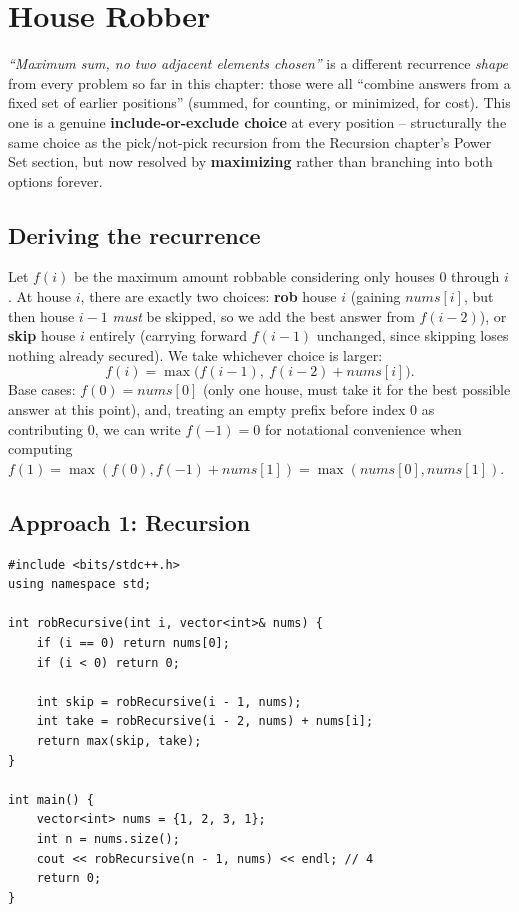 \section{House Robber}
\label{sec:dp-house-robber}


\begin{patternbox}
\emph{``Maximum sum, no two adjacent elements chosen''} is a different
recurrence \emph{shape} from every problem so far in this chapter: those
were all ``combine answers from a fixed set of earlier positions''
(summed, for counting, or minimized, for cost). This one is a genuine
\textbf{include-or-exclude choice} at every position -- structurally the
same choice as the pick/not-pick recursion from
the Recursion chapter's Power Set section, but now resolved by \textbf{maximizing}
rather than branching into both options forever.
\end{patternbox}

\subsection*{Deriving the recurrence}

Let $f(i)$ be the maximum amount robbable considering only houses $0$
through $i$. At house $i$, there are exactly two choices: \textbf{rob}
house $i$ (gaining $\textit{nums}[i]$, but then house $i-1$ \emph{must}
be skipped, so we add the best answer from $f(i-2)$), or \textbf{skip}
house $i$ entirely (carrying forward $f(i-1)$ unchanged, since skipping
loses nothing already secured). We take whichever choice is larger:
\[
  f(i) = \max\big(f(i-1),\ f(i-2) + \textit{nums}[i]\big).
\]
Base cases: $f(0) = \textit{nums}[0]$ (only one house, must take it for
the best possible answer at this point), and, treating an empty prefix
before index $0$ as contributing $0$, we can write $f(-1)=0$ for
notational convenience when computing $f(1) = \max(f(0), f(-1) +
\textit{nums}[1]) = \max(\textit{nums}[0], \textit{nums}[1])$.

\subsection*{Approach 1: Recursion}

\begin{lstlisting}
#include <bits/stdc++.h>
using namespace std;

int robRecursive(int i, vector<int>& nums) {
    if (i == 0) return nums[0];
    if (i < 0) return 0;

    int skip = robRecursive(i - 1, nums);
    int take = robRecursive(i - 2, nums) + nums[i];
    return max(skip, take);
}

int main() {
    vector<int> nums = {1, 2, 3, 1};
    int n = nums.size();
    cout << robRecursive(n - 1, nums) << endl; // 4
    return 0;
}
\end{lstlisting}

